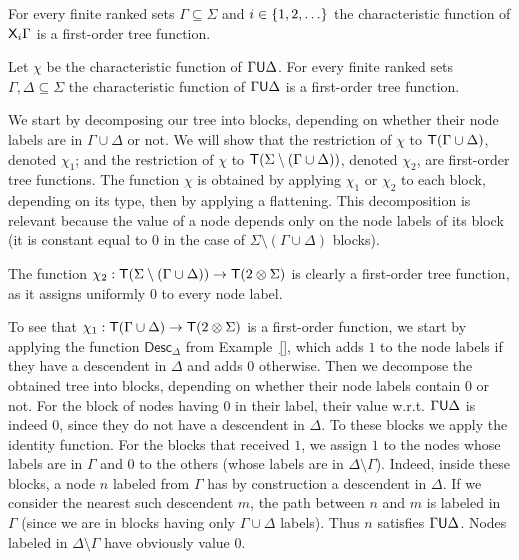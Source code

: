     \begin{lemma}\label{lem:nextmod}
        For every finite ranked sets $\Gamma \subseteq \Sigma$ and $i \in \{1,2,\ldots\}$ the characteristic function of $\mathsf X_i \Gamma$ is a first-order tree function.
    \end{lemma}
\begin{pr}
    
\end{pr}

\begin{lemma}\label{lem:untilmod}
Let $\chi$ be the characteristic function of $\Gamma \mathsf U \Delta$.
    For every finite ranked sets $\Gamma, \Delta \subseteq \Sigma$  the characteristic function of $\Gamma \mathsf U \Delta$ is a first-order tree function.
\end{lemma}
\begin{pr}
We start by decomposing our tree into blocks, depending on whether their node labels are in $\Gamma\cup\Delta$ or not. We will show that the restriction of $\chi$ to $\mathsf T (\Gamma\cup\Delta)$, denoted $\chi_1$; and the restriction of $\chi$ to $\mathsf T (\Sigma\setminus(\Gamma\cup\Delta))$, denoted $\chi_2$, are first-order tree functions. The function $\chi$ is obtained by applying $\chi_1$ or $\chi_2$ to each block, depending on its type, then by applying a flattening.
This decomposition is relevant because the value of a node depends only on the node labels of its block (it is constant equal to $0$ in the case of $\Sigma\setminus(\Gamma\cup\Delta)$ blocks).

The function $\chi_2:\mathsf T (\Sigma\setminus(\Gamma\cup\Delta))\to \mathsf T(2\otimes\Sigma)$ is clearly a first-order tree function, as it assigns uniformly $0$ to every node label. 

To see that $\chi_1:\mathsf T (\Gamma\cup\Delta)\to \mathsf T(2\otimes\Sigma)$ 
is a first-order function, we start by applying the function $\mathsf{Desc}_\Delta$ from
Example~\ref{}, which adds $1$ to the node labels if they have a descendent in $\Delta$ and adds $0$ otherwise. Then we decompose the obtained tree into blocks, depending on whether their node labels contain $0$ or not. For the block of nodes having $0$ in their label, their value w.r.t. $\Gamma\mathsf U \Delta$ is indeed $0$, since they do not have a descendent in $\Delta$. To these blocks we apply the identity function. For the blocks that received $1$, we assign $1$ to the nodes whose labels are in  $\Gamma$ and $0$ to the others (whose labels are in $\Delta\setminus\Gamma$). Indeed, inside these blocks, a node $n$ labeled from $\Gamma$ has by construction a descendent in $\Delta$. If we consider the nearest such descendent $m$, the path between $n$ and $m$  is labeled in $\Gamma$ (since we are in blocks having only $\Gamma\cup\Delta$ labels). Thus $n$ satisfies $\Gamma\mathsf U\Delta$. Nodes labeled in $\Delta\setminus\Gamma$ have obviously value $0$.      
\end{pr}


